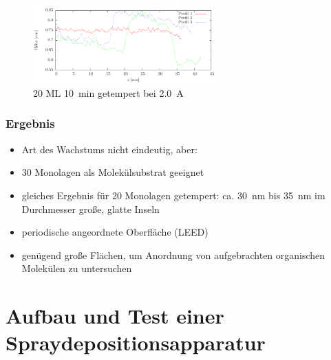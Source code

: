 \documentclass{beamer}
\begin{document}
\begin{frame}
\begin{figure}[H]
\begin{minipage}[b]{0.45\textwidth}
		\caption*{20 ML \SI{10}{min} getempert bei \SI{2,0}{A}}
	\end{minipage}
	\centering
		\includegraphics[height=3cm]{bilder/profiles20MLget}
\end{figure}
\end{frame}

\begin{frame}
\frametitle{Ergebnis}
\begin{itemize}\setlength{\itemsep}{+15pt}
  \item Art des Wachstums nicht eindeutig, aber:
  \item 30 Monolagen als Molekülsubstrat geeignet
  \item gleiches Ergebnis für 20 Monolagen getempert: ca. \SI{30}{nm} bis \SI{35}{nm} im Durchmesser
  große, glatte Inseln
  \item periodische angeordnete Oberfläche (LEED)
  \item genügend große Flächen, um Anordnung von aufgebrachten organischen Molekülen zu untersuchen
\end{itemize}
\end{frame}




\section{Aufbau und Test einer Spraydepositionsapparatur}
\end{document}
